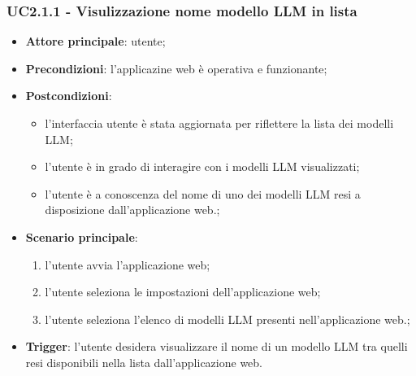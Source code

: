 \documentclass[10pt, a4paper]{article}
\begin{document}
    \subsubsection{UC2.1.1 - Visulizzazione nome modello LLM in lista}
    \begin{itemize}
        \item \textbf{Attore principale}: utente;
        \item \textbf{Precondizioni}: l'applicazine web è operativa e funzionante;
        \item \textbf{Postcondizioni}: 
        \begin{itemize}
            \item l'interfaccia utente è stata aggiornata per riflettere la lista dei modelli LLM;
            \item l'utente è in grado di interagire con i modelli LLM visualizzati;
            \item l'utente è a conoscenza del nome di uno dei modelli LLM resi a disposizione dall'applicazione web.;
        \end{itemize}  
        \item \textbf{Scenario principale}:
            \begin{enumerate}
                \item l'utente avvia l'applicazione web;
                \item l'utente seleziona le impostazioni dell'applicazione web;
                \item l'utente seleziona l'elenco di modelli LLM presenti nell'applicazione web.;
            \end{enumerate}
        \item \textbf{Trigger}: l'utente desidera visualizzare il nome di un modello LLM tra quelli resi disponibili nella lista dall'applicazione web.
    \end{itemize}
\end{document}
